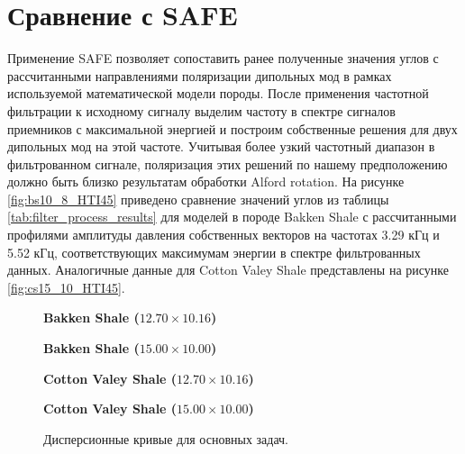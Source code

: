 \documentclass[a4paper,11pt]{article}
\begin{document}
\section{Сравнение с SAFE}
\label{safe_comparison}

Применение SAFE позволяет сопоставить ранее полученные значения углов с рассчитанными направлениями поляризации дипольных мод в рамках используемой математической модели породы. После применения частотной фильтрации к исходному сигналу выделим частоту в спектре сигналов приемников с максимальной энергией и построим собственные решения для двух дипольных мод на этой частоте. Учитывая более узкий частотный диапазон в фильтрованном сигнале, поляризация этих решений по нашему предположению должно быть близко результатам обработки Alford rotation. На рисунке \ref{fig:bs10_8_HTI45} приведено сравнение значений углов из таблицы \ref{tab:filter_process_results} для моделей в породе Bakken Shale с рассчитанными профилями амплитуды давления собственных векторов на частотах 3.29 кГц и 5.52 кГц, соответствующих максимумам энергии в спектре фильтрованных данных. Аналогичные данные для Cotton Valey Shale представлены на рисунке \ref{fig:cs15_10_HTI45}.

\begin{figure}[h]
\centering
\begin{minipage}{0.49\linewidth}
	\centering \textbf{Bakken Shale ($12.70 \times 10.16$)}
	 \\
\end{minipage}
\begin{minipage}{0.49\linewidth}
	\centering \textbf{Bakken Shale ($15.00 \times 10.00$)}
	 \\
\end{minipage}
\begin{minipage}{0.49\linewidth}
	\centering \textbf{Cotton Valey Shale ($12.70 \times 10.16$)}
	 \\
\end{minipage}
\begin{minipage}{0.49\linewidth}
	\centering \textbf{Cotton Valey Shale ($15.00 \times 10.00$)}
	 \\
\end{minipage}
\caption{Дисперсионные кривые для основных задач. }
\label{fig:disp_curves_all}
\end{figure}
\end{document}
